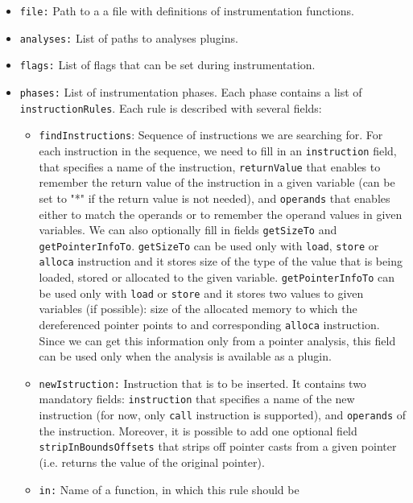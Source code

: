 \medskip
\begin{itemize}
\item \texttt{file:} Path to a a file with definitions of instrumentation functions.
\item \texttt{analyses:} List of paths to analyses plugins.
\item \texttt{flags:} List of flags that can be set during instrumentation.
\item \texttt{phases:} List of instrumentation phases. Each phase contains a
  list of \texttt{instructionRules}. Each rule is described with several fields:
  \begin{itemize}
    \item \texttt{findInstructions}: Sequence of instructions we are searching
    for. For each instruction in the sequence, we need to fill in an
        \texttt{instruction} field, that specifies a name of the instruction,
        \texttt{returnValue} that enables to remember the return value of the
        instruction in a given variable (can be set to "*" if the return value
        is not needed), and \texttt{operands} that enables either to match the
        operands or to remember the operand values in given variables. We can
        also optionally fill in fields \texttt{getSizeTo} and
        \texttt{getPointerInfoTo}. \texttt{getSizeTo} can be used only with
        \texttt{load}, \texttt{store} or \texttt{alloca} instruction and it
        stores size of the type of the value that is being loaded, stored or
        allocated to the given variable. \texttt{getPointerInfoTo} can be used
        only with \texttt{load} or \texttt{store} and it stores two values to
        given variables (if possible): size of the allocated memory to which
        the dereferenced pointer points to and corresponding \texttt{alloca}
        instruction. Since we can get this information only from a pointer
        analysis, this field can be used only when the analysis is available as
        a plugin.
    \item \texttt{newIstruction:} Instruction that is to be inserted. It
    contains two mandatory fields: \texttt{instruction} that specifies a name
    of the new instruction (for now, only \texttt{call} instruction is
    supported), and \texttt{operands} of the instruction. Moreover, it is
    possible to add one optional field \texttt{stripInBoundsOffsets} that
    strips off pointer casts from a given pointer (i.e. returns the value of
    the original pointer).
    \item \texttt{in:} Name of a function, in which this rule should be

\end{itemize}
\end{itemize}
